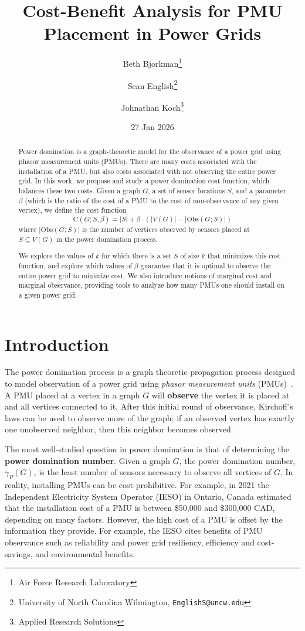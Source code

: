 \documentclass{article}
\title{Cost-Benefit Analysis for PMU Placement in Power Grids}
\author{Beth Bjorkman\footnote{Air Force Research Laboratory} \and Sean English\footnote{University of North Carolina Wilmington, \texttt{EnglishS@uncw.edu}} \and Johnathan Koch\footnote{Applied Research Solutions}}
\date{27 Jan 2026}
\begin{document}
\maketitle

\begin{abstract}
    Power domination is a graph-theoretic model for the observance of a power grid using phasor measurement units (PMUs).
    There are many costs associated with the installation of a PMU, but also costs associated with not observing the entire power grid.
    In this work, we propose and study a power domination cost function, which balances these two costs.
    Given a graph $G$, a set of sensor locations $S$, and a parameter $\beta$ (which is the ratio of the cost of a PMU to the cost of non-observance of any given vertex), we define the cost function
    \[ \mathrm{C}(G;S,\beta)=|S|+\beta\cdot (|V(G)|-|\mathrm{Obs}(G;S)|) \]
    where $|\mathrm{Obs}(G;S)|$ is the number of vertices observed by sensors placed at $S\subseteq V(G)$ in the power domination process.
    
    We explore the values of $k$ for which there is a set $S$ of size $k$ that minimizes this cost function, and explore which values of $\beta$ guarantee that it is optimal to observe the entire power grid to minimize cost.
    We also introduce notions of marginal cost and marginal observance, providing tools to analyze how many PMUs one should install on a given power grid.
\end{abstract}

\section{Introduction}
    The power domination process is a graph theoretic propagation process designed to model observation of a power grid using \emph{phasor measurement units} (PMUs)~\cite{HHHH2002}.
    A PMU placed at a vertex in a graph $G$ will \textbf{observe} the vertex it is placed at and all vertices connected to it.
    After this initial round of observance, Kirchoff's laws can be used to observe more of the graph; if an observed vertex has exactly one unobserved neighbor, then this neighbor becomes observed. 
    
    The most well-studied question in power domination is that of determining the \textbf{power domination number}.
    Given a graph $G$, the power domination number, $\gamma_P(G)$, is the least number of sensors necessary to observe all vertices of $G$.
    In reality, installing PMUs can be cost-prohibitive.
    For example, in 2021 the Independent Electricity System Operator (IESO) in Ontario, Canada estimated that the installation cost of a PMU is between \$50,000 and \$300,000 CAD, depending on many factors\cite{IESO2021a}.
    However, the high cost of a PMU is offset by the information they provide.
    For example, the IESO cites benefits of PMU observance such as reliability and power grid resiliency, efficiency and cost-savings, and environmental benefits\cite{IESO2021b}.
\end{document}
